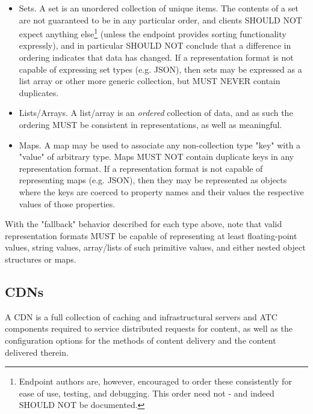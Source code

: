\begin{itemize}
	\begin{itemize}
		\item Sets. A set is an unordered collection of unique items. The
		contents of a set are not guaranteed to be in any particular order, and
		clients SHOULD NOT expect anything else\footnote{Endpoint authors are,
		however, encouraged to order these consistently for ease of use,
		testing, and debugging. This order need not - and indeed SHOULD NOT be
		documented.} (unless the endpoint provides sorting functionality
		expressly), and in particular SHOULD NOT conclude that a difference in
		ordering indicates that data has changed. If a representation format is
		not capable of expressing set types (e.g. JSON), then sets may be
		expressed as a list array or other more generic collection, but MUST
		NEVER contain duplicates.

		\item Lists/Arrays. A list/array is an \emph{ordered} collection of
		data, and as such the ordering MUST be consistent in representations, as
		well as meaningful.

		\item Maps. A map may be used to associate any non-collection type "key"
		with a "value" of arbitrary type. Maps MUST NOT contain duplicate keys
		in any representation format. If a representation format is not capable
		of representing maps (e.g. JSON), then they may be represented as
		objects where the keys are coerced to property names and their values
		the respective values of those properties.
	\end{itemize}
\end{itemize}

With the "fallback" behavior described for each type above, note that valid
representation formats MUST be capable of representing at least floating-point
values, string values, array/lists of such primitive values, and either nested
object structures or maps.

\subsection{CDNs}
A CDN is a full collection of caching and infrastructural servers and ATC
components required to service distributed requests for content, as well as the
configuration options for the methods of content delivery and the content
delivered therein.

